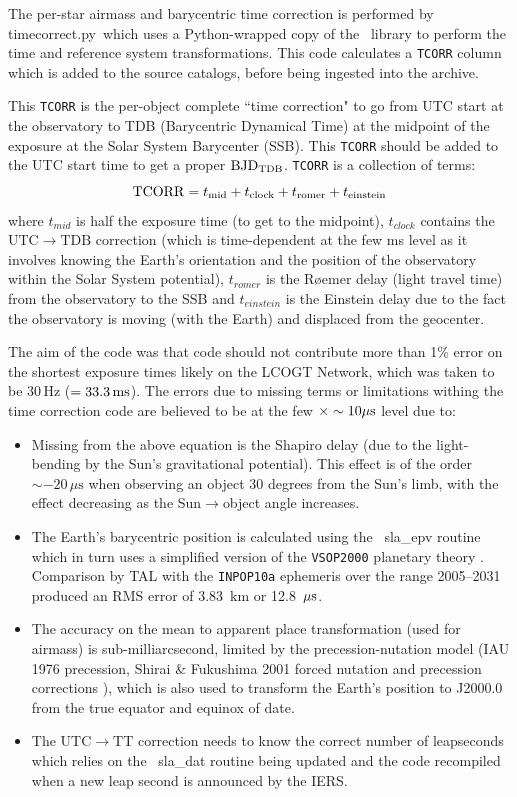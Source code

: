 \documentclass[twoside,11pt,nolof]{starlink}
\providecommand{\SLALIB}{\xref{\textsc{{SLALIB}}}{sun67}{}}
\providecommand{\task}[1]{\textsf{#1}}
\providecommand{\ndfcomp}[1]{\texttt{#1}}    %
\providecommand{\LCONet}{LCOGT Network}
\providecommand{\rmn}[1] {\mathrm{#1}}
\begin{document}
The per-star airmass and barycentric time correction is performed by
\task{timecorrect.py}\ which uses a Python-wrapped copy of the \SLALIB\ library
to perform the time and reference system transformations. This code calculates a
\ndfcomp{TCORR} column which is added to the source catalogs, before being
ingested into the archive. 

This \ndfcomp{TCORR} is the per-object complete ``time correction" to go from UTC start at the
observatory to TDB (Barycentric Dynamical Time) at the midpoint of the exposure
at the Solar System Barycenter (SSB). This \ndfcomp{TCORR} should be added to the UTC
start time to get a proper ${\rm BJD}_{\rm TDB}$. \ndfcomp{TCORR} is a collection of terms:
\begin{equation}
{\rm TCORR} = t_{\rm mid}+t_{\rm clock}+t_{\rm romer}+t_{\rm einstein}
\end{equation}
where $t_{mid}$ is half the exposure time (to get to the midpoint), $t_{clock}$
contains the $\rmn{UTC}\rightarrow\rmn{TDB}$ correction (which is time-dependent at the few ms level as
it involves knowing the Earth's orientation and the position of the observatory
within the Solar System potential), $t_{romer}$ is the R\o emer delay (light travel
time) from the observatory to the SSB and $t_{einstein}$ is the Einstein delay due
to the fact the observatory is moving (with the Earth) and displaced from the geocenter.

The aim of the code was that code should not contribute more than 1\% error on
the shortest exposure times likely on the \LCONet, which was taken to be 30\,Hz
($=33.3\,{\rm ms}$). The errors due to missing terms or limitations withing the
time correction code are believed to be at the few $\times\sim10\mu{\rm s}$
level due to:
\begin{itemize}
\item Missing from the above equation is the Shapiro delay (due to the light-bending
by the Sun's gravitational potential). This effect is of the order $\sim-20\,\mu\rmn{s}$
when observing an object 30 degrees from the Sun's limb, with the effect decreasing as the
Sun$\rightarrow$object angle increases.
\item The Earth's barycentric position is calculated using the \SLALIB\
\task{sla\_epv} routine which in turn uses a simplified version of the
\texttt{VSOP2000} planetary theory \cite{vsop2000}. Comparison by TAL with the
\texttt{INPOP10a} ephemeris \cite{inpop10a} over the range 2005--2031 produced
an RMS error of 3.83\ km or 12.8\ $\mu{\rm s}$.
\item The accuracy on the mean to apparent place transformation (used for
airmass) is sub-milliarcsecond, limited by the precession-nutation model (IAU
1976 precession, Shirai \& Fukushima 2001 forced nutation and precession
corrections \cite{sf2001}), which is also used to transform the Earth's position to
J2000.0 from the true equator and equinox of date.
\item The $\rmn{UTC}\rightarrow\rmn{TT}$ correction needs to know the correct
number of leapseconds which relies on the \SLALIB\ \task{sla\_dat} routine being
updated and the code recompiled when a new leap second is announced by the IERS.
\end{itemize}
\end{document}
